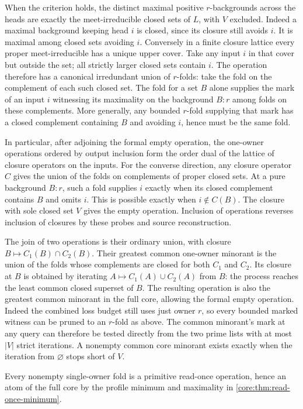 When the criterion holds, the distinct maximal positive
$r$-backgrounds across the heads are exactly the
meet-irreducible closed sets of $L$, with $V$ excluded.
Indeed a maximal background keeping head $i$ is closed,
since its closure still avoids $i$. It is maximal among
closed sets avoiding $i$. Conversely in a finite closure
lattice every proper meet-irreducible has a unique upper
cover. Take any input $i$ in that cover but outside the
set; all strictly larger closed sets contain $i$.
The operation therefore has a canonical irredundant union
of $r$-folds: take the fold on the complement of each such
closed set. The fold for a set $B$ alone supplies the mark
of an input $i$ witnessing its maximality on the background
$B:r$ among folds on these complements. More generally,
any bounded $r$-fold supplying that mark has a closed
complement containing $B$ and avoiding $i$, hence must
be the same fold.

In particular, after adjoining the formal empty operation,
the one-owner operations ordered by output inclusion form the
order dual of the lattice of closure operators on the inputs.
For the converse direction, any closure operator $C$ gives
the union of the folds on complements of proper closed sets.
At a pure background $B:r$, such a fold supplies $i$ exactly
when its closed complement contains $B$ and omits $i$.
This is possible exactly when $i\notin C(B)$.
The closure with sole closed set $V$ gives the empty operation.
Inclusion of operations reverses inclusion of closures by
these probes and source reconstruction.

The join of two operations is their ordinary union, with
closure $B\mapsto C_1(B)\cap C_2(B)$. Their greatest common
one-owner minorant is the union of the folds whose complements
are closed for both $C_1$ and $C_2$. Its closure at $B$ is
obtained by iterating $A\mapsto C_1(A)\cup C_2(A)$ from $B$:
the process reaches the least common closed superset of $B$.
The resulting operation is also the greatest common minorant
in the full core, allowing the formal empty operation.
Indeed the combined loss budget still uses just owner $r$,
so every bounded marked witness can be pruned to an $r$-fold
as above. The common minorant's mark at any query can therefore
be tested directly from the two prime lists with at most
$|V|$ strict iterations. A nonempty common core minorant
exists exactly when the iteration from $\varnothing$ stops
short of $V$.

Every nonempty single-owner fold is a primitive read-once
operation, hence an atom of the full core by the profile
minimum and maximality in \cref{core:thm:read-once-minimum}.

